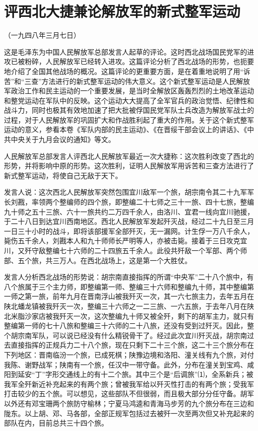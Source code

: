 \documentclass[UTF-8, a5paper, 12pt]{ctexart}
\begin{document}
\section{评西北大捷兼论解放军的新式整军运动}

（一九四八年三月七日）

这是毛泽东为中国人民解放军总部发言人起草的评论。这时西北战场国民党军的进攻已被粉碎，人民解放军已经转入进攻。这篇评论分析了西北战场的形势，也扼要地介绍了全国其他战场的概况。这篇评论的更重要方面，是在着重地说明了用“诉苦”和“三查”方法进行的新式整军运动的伟大意义。这个新式整军运动是人民解放军政治工作和民主运动的一个重要发展，是当时全解放区轰轰烈烈的土地改革运动和整党运动在军队中的反映。这个运动大大提高了全军官兵的政治觉悟、纪律性和战斗力，同时也极其有效地加速了把大批被俘国民党军队士兵改造为解放军战士的过程，对于人民解放军的巩固扩大和作战胜利起了重大的作用。关于这个新式整军运动的意义，参看本卷《军队内部的民主运动》、《在晋绥干部会议上的讲话》、《中共中央关于九月会议的通知》等文。

人民解放军总部发言人评西北人民解放军最近一次大捷称：这次胜利改变了西北的形势，并将影响中原的形势。这次胜利，证明人民解放军用诉苦和三查方法进行了新式整军运动，将使自己无敌于天下。

发言人说：这次西北人民解放军突然包围宜川敌军一个旅，胡宗南令其二十九军军长刘戡，率领两个整编师的四个旅，即整编二十七师之三十一旅、四十七旅，整编九十师之五十三旅、六十一旅共约二万四千余人，由洛川、宜君一线向宜川驰援，于二十八日到达宜川西南地区。西北人民解放军发起歼灭战，经过二十九日至三月一日三十小时的战斗，即将该部援军全部歼灭，无一漏网。计生俘一万八千余人，毙伤五千余人，刘戡本人和九十师师长严明等人，亦被击毙。接着于三日攻克宜川，又歼守敌整编七十六师的二十四旅五千余人。此役共歼敌一个军部、两个师部、五个旅，共三万人。在西北战场上，这是第一个大胜仗。

发言人分析西北战场的形势说：胡宗南直接指挥的所谓“中央军”二十八个旅中，有八个旅属于三个主力师，即整编第一师、整编三十六师和整编九十师，其中整编第一师之第一旅，前年九月在晋南浮山被我歼灭一次，其一六七旅主力，去年五月在陕北蟠龙镇被我歼灭一次，整编三十六师之一二三旅、一六五旅，于去年八月在陕北米脂沙家店被我歼灭一次，这次整编九十师又被全歼，剩下的胡军主力，就只有整编第一师的七十八旅和整编三十六师的二十八旅，还没有受到过歼灭。因此，整个胡宗南军队，可以说已经没有什么精锐骨干了。经过此次宜川歼灭战，胡宗南过去直接指挥的正规兵力二十八个旅，现在只剩下二十三个旅，这二十三个旅分布在下列地区：晋南临汾一个旅，已成死棋；陕豫边境和洛阳、潼关线有九个旅，对付我陈、谢野战军；陕南有一个旅，任汉中一带守备。此外，分布在潼关到宝鸡、咸阳到延安“丁”字形交通线上的有十二个旅。其中三个是“后调旅”⑴，全系新兵；被我军全歼新近补充起来的有两个旅；曾被我军给以歼灭性打击的有两个旅；受我军打击较少的五个旅。可以想见，这些部队不但很弱，而且极大部分分任守备。胡军以外还有邓宝珊两个旅防守榆林；宁夏马鸿逵和青海马步芳的九个旅分布在三边和陇东。以上胡、邓、马各部，全部正规军包括过去被歼一次至两次但又补充起来的部队在内，目前总共三十四个旅。
\end{document}
